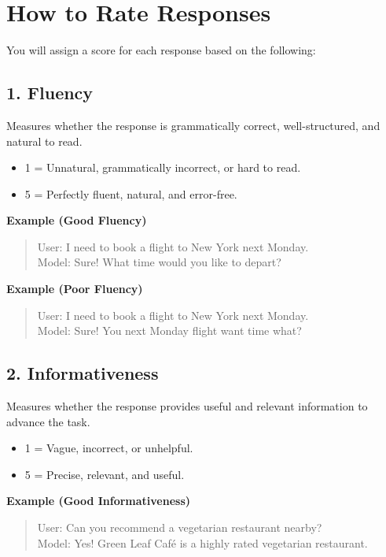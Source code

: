 \section*{How to Rate Responses}
You will assign a score for each response based on the following:

\subsection*{1. Fluency}
Measures whether the response is grammatically correct, well-structured, and natural to read.

\begin{itemize}
    \item 1 = Unnatural, grammatically incorrect, or hard to read.
    \item 5 = Perfectly fluent, natural, and error-free.
\end{itemize}

\textbf{Example (Good Fluency)}
\begin{quote}
User: I need to book a flight to New York next Monday.\\
Model: Sure! What time would you like to depart?
\end{quote}

\textbf{Example (Poor Fluency)}
\begin{quote}
User: I need to book a flight to New York next Monday.\\
Model: Sure! You next Monday flight want time what?
\end{quote}

\subsection*{2. Informativeness}
Measures whether the response provides useful and relevant information to advance the task.

\begin{itemize}
    \item 1 = Vague, incorrect, or unhelpful.
    \item 5 = Precise, relevant, and useful.
\end{itemize}

\textbf{Example (Good Informativeness)}
\begin{quote}
User: Can you recommend a vegetarian restaurant nearby?\\
Model: Yes! Green Leaf Café is a highly rated vegetarian restaurant.
\end{quote}

